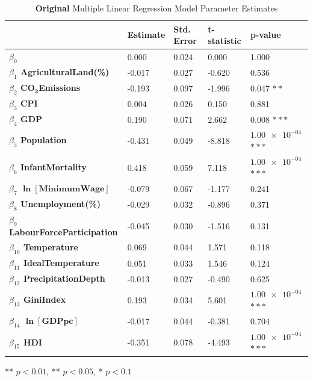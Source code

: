 \documentclass{article}
\begin{document}
\begin{appendices}
\begin{table}[H]
    \centering
        \begin{threeparttable}
            \begin{tabular}{l l l l l}
              \toprule & \textbf{Estimate} & \textbf{Std. Error} & \textbf{t-statistic} & \textbf{p-value} \\ \midrule
            \textbf{$\beta_0$} & 0.000 & 0.024 & 0.000 & 1.000 \\ 
            \textbf{$\beta_1$ AgriculturalLand(\%)} & -0.017 & 0.027 & -0.620 & 0.536  \\ 
            \textbf{$\beta_2$ $\bm{CO_2}$Emissions} & -0.193 & 0.097 & -1.996 & 0.047 $**$  \\ 
            \textbf{$\beta_3$ CPI} & 0.004 & 0.026 & 0.150 & 0.881 \\ 
            \textbf{$\beta_4$ GDP} & 0.190 & 0.071 & 2.662 & 0.008 $***$ \\ 
            \textbf{$\beta_5$ Population} & -0.431 & 0.049 & -8.818 & $\num{1.00e-04}$ $***$ \\ 
            \textbf{$\beta_6$ InfantMortality} & 0.418 & 0.059 & 7.118 & $\num{1.00e-04}$ $***$ \\ 
            \textbf{$\beta_7$ $\bm{\ln{[\text{MinimumWage}]}}$} & -0.079 & 0.067 & -1.177 & 0.241 \\ 
            \textbf{$\beta_8$ Unemployment(\%)} & -0.029 & 0.032 & -0.896 & 0.371 \\ 
            \textbf{$\beta_9$ LabourForceParticipation} & -0.045 & 0.030 & -1.516 & 0.131 \\ 
            \textbf{$\beta_{10}$ Temperature} & 0.069 & 0.044 & 1.571 & 0.118 \\ 
            \textbf{$\beta_{11}$ IdealTemperature} & 0.051 & 0.033 & 1.546 & 0.124 \\ 
            \textbf{$\beta_{12}$ PrecipitationDepth} & -0.013 & 0.027 & -0.490 & 0.625 \\ 
            \textbf{$\beta_{13}$ GiniIndex} & 0.193 & 0.034 & 5.601 & $\num{1.00e-04}$ $***$\\ 
            \textbf{$\beta_{14}$ $\bm{\ln{[\text{GDPpc}]}}$} & -0.017 & 0.044 & -0.381 & 0.704 \\ 
            \textbf{$\beta_{15}$ HDI} & -0.351 & 0.078 & -4.493 & $\num{1.00e-04}$ $***$ \\ \bottomrule
            \end{tabular}
            \begin{tablenotes}
                \small
                \item *** $p < 0.01$, ** $p < 0.05$, * $p < 0.1$
            \end{tablenotes}
        \end{threeparttable}
    \caption{\label{table: descriptivestatsoriginal}\textbf{Original} Multiple Linear Regression Model Parameter Estimates}
\end{table}


\end{appendices}
\end{document}
